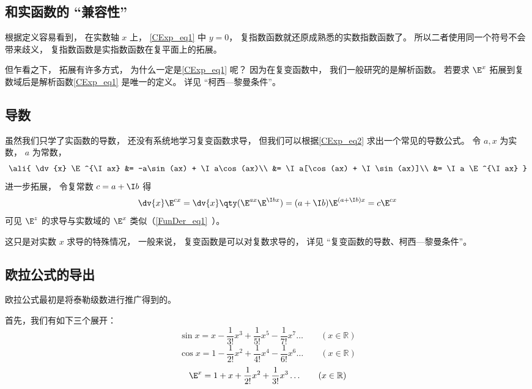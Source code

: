 \subsection{和实函数的 “兼容性”}
根据定义容易看到， 在实数轴 $x$ 上， \autoref{CExp_eq1} 中 $y = 0$， 复指数函数就还原成熟悉的实数指数函数了。 所以二者使用同一个符号不会带来歧义， 复指数函数是实指数函数在复平面上的拓展。

但乍看之下， 拓展有许多方式， 为什么一定是\autoref{CExp_eq1} 呢？ 因为在复变函数中， 我们一般研究的是解析函数。 若要求 $\E^x$ 拓展到复数域后是解析函数\autoref{CExp_eq1} 是唯一的定义。 详见 “柯西—黎曼条件”。

\subsection{导数}
虽然我们只学了实函数的导数， 还没有系统地学习复变函数求导， 但我们可以根据\autoref{CExp_eq2} 求出一个常见的导数公式。 令 $a, x$ 为实数， $a$ 为常数，
\begin{equation}\ali{
\dv{x} \E^{\I ax} &= -a\sin(ax) + \I a\cos(ax)\\
&= \I a[\cos(ax) + \I \sin(ax)]\\
&= \I a \E^{\I ax}
}\end{equation}
进一步拓展， 令复常数 $c = a + \I b$ 得
\begin{equation}
\dv{x}\E^{c x} = \dv{x} \qty(\E^{ax}\E^{\I bx}) = (a + \I b)\E^{(a+\I b)x} = c\E^{cx}
\end{equation}
可见 $\E^z$ 的求导与实数域的 $\E^x$ 类似（\autoref{FunDer_eq1}~）。

这只是对实数 $x$ 求导的特殊情况， 一般来说， 复变函数是可以对复数求导的， 详见 “复变函数的导数、柯西—黎曼条件”。

\subsection{欧拉公式的导出}


欧拉公式最初是将泰勒级数进行推广得到的。

首先，我们有如下三个展开：
\begin{equation}\label{CExp_eq3}
\sin x = x - \frac{1}{3!} x^3 + \frac{1}{5!} x^5 - \frac{1}{7!} x^7 \ldots
\qquad (x \in \mathbb R)
\end{equation}
\begin{equation}\label{CExp_eq5}
\cos x = 1 - \frac{1}{2!} x^2 + \frac{1}{4!} x^4 -\frac{1}{6!} x^6 \ldots
\qquad (x \in \mathbb R)
\end{equation}
\begin{equation}
\E^x =1 + x + \frac{1}{2!} x^2 + \frac{1}{3!} x^3  \ldots
\qquad (x \in \mathbb R)
\end{equation}

